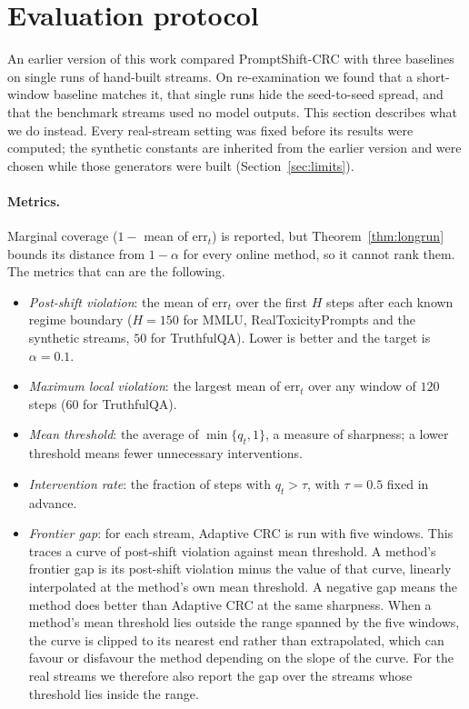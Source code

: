 
\section{Evaluation protocol}\label{sec:protocol}

An earlier version of this work compared PromptShift-CRC with three baselines on single runs of hand-built streams. On re-examination we found that a short-window baseline matches it, that single runs hide the seed-to-seed spread, and that the benchmark streams used no model outputs. This section describes what we do instead. Every real-stream setting was fixed before its results were computed; the synthetic constants are inherited from the earlier version and were chosen while those generators were built (Section~\ref{sec:limits}).

\paragraph{Metrics.}
Marginal coverage ($1-$ mean of $\mathrm{err}_t$) is reported, but Theorem~\ref{thm:longrun} bounds its distance from $1-\alpha$ for every online method, so it cannot rank them. The metrics that can are the following.
\begin{itemize}[nosep]
  \item \emph{Post-shift violation}: the mean of $\mathrm{err}_t$ over the first $H$ steps after each known regime boundary ($H=150$ for MMLU, RealToxicityPrompts and the synthetic streams, $50$ for TruthfulQA). Lower is better and the target is $\alpha=0.1$.
  \item \emph{Maximum local violation}: the largest mean of $\mathrm{err}_t$ over any window of $120$ steps ($60$ for TruthfulQA).
  \item \emph{Mean threshold}: the average of $\min\{q_t,1\}$, a measure of sharpness; a lower threshold means fewer unnecessary interventions.
  \item \emph{Intervention rate}: the fraction of steps with $q_t>\tau$, with $\tau=0.5$ fixed in advance.
  \item \emph{Frontier gap}: for each stream, Adaptive CRC is run with five windows. This traces a curve of post-shift violation against mean threshold. A method's frontier gap is its post-shift violation minus the value of that curve, linearly interpolated at the method's own mean threshold. A negative gap means the method does better than Adaptive CRC at the same sharpness. When a method's mean threshold lies outside the range spanned by the five windows, the curve is clipped to its nearest end rather than extrapolated, which can favour or disfavour the method depending on the slope of the curve. For the real streams we therefore also report the gap over the streams whose threshold lies inside the range.
\end{itemize}

